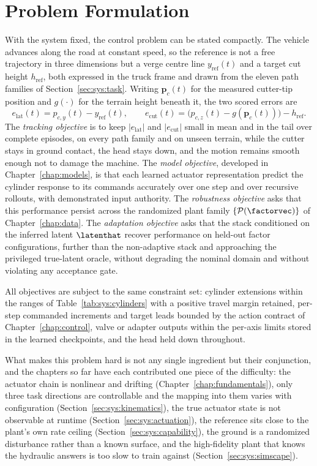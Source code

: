 \section{Problem Formulation}
\label{sec:sys:problem}

With the system fixed, the control problem can be stated compactly.
The vehicle advances along the road at constant speed, so the reference
is not a free trajectory in three dimensions but a verge centre line
$y_{\mathrm{ref}}(t)$ and a target cut height $h_{\mathrm{ref}}$, both
expressed in the truck frame and drawn from the eleven path families of
Section~\ref{sec:sys:task}. Writing $\bm{p}_c(t)$ for the measured
cutter-tip position and $g(\cdot)$ for the terrain height beneath it,
the two scored errors are
%
\begin{equation}
  \label{eq:sys:error}
  e_{\mathrm{lat}}(t) = p_{c,y}(t) - y_{\mathrm{ref}}(t),
  \qquad
  e_{\mathrm{cut}}(t)
    = \bigl(p_{c,z}(t) - g(\bm{p}_c(t))\bigr) - h_{\mathrm{ref}} .
\end{equation}
%
The \emph{tracking objective} is to keep $|e_{\mathrm{lat}}|$ and
$|e_{\mathrm{cut}}|$ small in mean and in the tail over complete
episodes, on every path family and on unseen terrain, while the cutter
stays in ground contact, the head stays down, and the motion remains
smooth enough not to damage the machine. The \emph{model objective},
developed in Chapter~\ref{chap:models}, is that each learned actuator
representation predict the cylinder response to its commands accurately
over one step and over recursive rollouts, with demonstrated input
authority. The \emph{robustness objective} asks that this performance
persist across the randomized plant family $\{\mathcal{P}(\factorvec)\}$
of Chapter~\ref{chap:data}. The \emph{adaptation objective} asks that
the stack conditioned on the inferred latent $\latenthat$ recover
performance on held-out factor configurations, further than the
non-adaptive stack and approaching the privileged true-latent oracle,
without degrading the nominal domain and without violating any
acceptance gate.

All objectives are subject to the same constraint set: cylinder
extensions within the ranges of Table~\ref{tab:sys:cylinders} with a
positive travel margin retained, per-step commanded increments and
target leads bounded by the action contract of
Chapter~\ref{chap:control}, valve or adapter outputs within the per-axis
limits stored in the learned checkpoints, and the head held down
throughout.

What makes this problem hard is not any single ingredient but their
conjunction, and the chapters so far have each contributed one piece of
the difficulty: the actuator chain is nonlinear and drifting
(Chapter~\ref{chap:fundamentals}), only three task directions are
controllable and the mapping into them varies with configuration
(Section~\ref{sec:sys:kinematics}), the true actuator state is not
observable at runtime (Section~\ref{sec:sys:actuation}), the reference
sits close to the plant's own rate ceiling
(Section~\ref{sec:sys:capability}), the ground is a randomized
disturbance rather than a known surface, and the high-fidelity plant
that knows the hydraulic answers is too slow to train against
(Section~\ref{sec:sys:simscape}).

